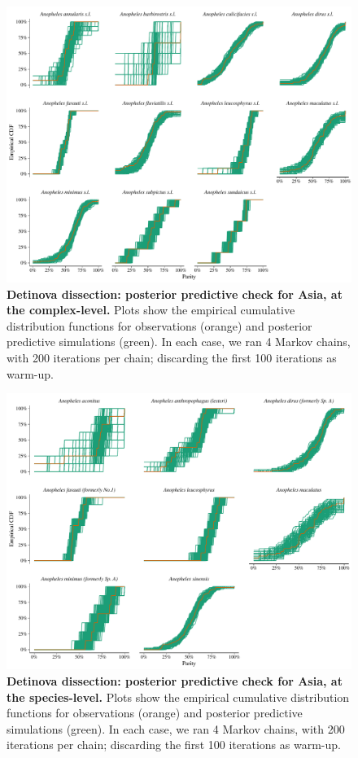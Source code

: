 \documentclass[12pt]{article}
\begin{document}
{\begin{figure}[ht]
	\centerline{\includegraphics[width=1\textwidth]{./Figure_files/detinova_ecdf_asia_grouped.pdf}}
	\caption{\textbf{Detinova dissection: posterior predictive check for Asia, at the complex-level.} Plots show the empirical cumulative distribution functions for observations (orange) and posterior predictive simulations (green). In each case, we ran 4 Markov chains, with 200 iterations per chain; discarding the first 100 iterations as warm-up.}\label{fig:detinova_ecdf_asia_grouped}
\end{figure}

\begin{figure}[ht]
	\centerline{\includegraphics[width=1\textwidth]{./Figure_files/detinova_ecdf_asia_species.pdf}}
	\caption{\textbf{Detinova dissection: posterior predictive check for Asia, at the species-level.} Plots show the empirical cumulative distribution functions for observations (orange) and posterior predictive simulations (green). In each case, we ran 4 Markov chains, with 200 iterations per chain; discarding the first 100 iterations as warm-up.}\label{fig:detinova_ecdf_asia_species}
\end{figure}


}
\end{document}
